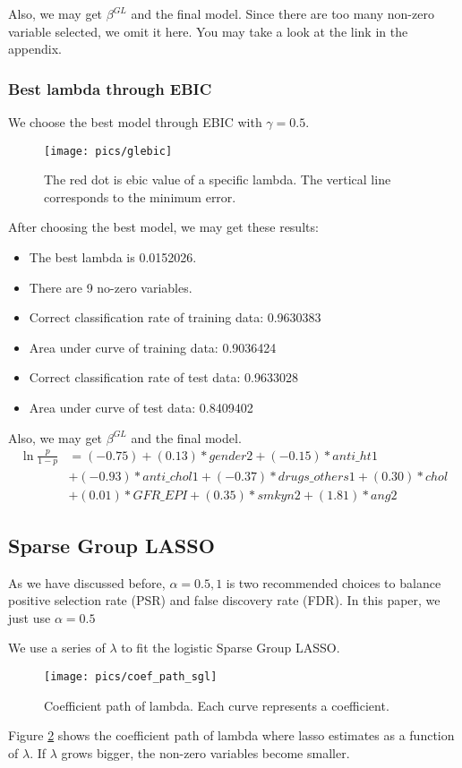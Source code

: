 \documentclass[]{article}
\begin{document}
Also, we may get $ \beta^{GL} $ and the final model. Since there are too many non-zero variable selected, we omit it here. You may take a look at the link in the appendix.

\subsubsection{Best lambda through EBIC}
We choose the best model through EBIC with $ \gamma=0.5 $.

\begin{figure}[H]
	\centering
	\texttt{[image: pics/glebic]}
	\caption{The red dot is ebic value of a specific lambda. The vertical line corresponds to the minimum error.\label{fig=glebic}}
\end{figure}

After choosing the best model, we may get these results:
\begin{itemize}
	\item The best lambda is 0.0152026.
	\item There are 9 no-zero variables.
	\item Correct classification rate of training data: 0.9630383
	\item Area under curve of training data: 0.9036424
	\item Correct classification rate of test data: 0.9633028
	\item Area under curve of test data: 0.8409402
\end{itemize}

Also, we may get $ \beta^{GL} $ and the final model.
\begin{align*}
\ln\frac{p}{1-p}&=(-0.75) + ( 0.13)*gender2 + (-0.15)*anti\_ht1\\ &+
(-0.93)*anti\_chol1 + (-0.37)*drugs\_others1 + ( 0.30)*chol \\ &+
( 0.01)*GFR\_EPI + ( 0.35)*smkyn2 + ( 1.81)*ang2
\end{align*}

\subsection{Sparse Group LASSO}
As we have discussed before, $ \alpha=0.5,1 $ is two recommended choices to balance positive selection rate (PSR) and false discovery rate (FDR). In this paper, we just use $ \alpha=0.5$

We use a series of $\lambda$ to fit the logistic Sparse Group LASSO.
\begin{figure}[H]
	\centering
	\texttt{[image: pics/coef\_path\_sgl]}
	\caption{Coefficient path of lambda. Each curve represents a coefficient.\label{fig=cpsgl}}
\end{figure}
Figure \ref{fig=cpsgl} shows the coefficient path of lambda where lasso estimates as a function of $ \lambda $. If $ \lambda $ grows bigger, the non-zero variables become smaller. 
\end{document}
